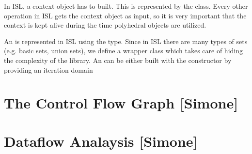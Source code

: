 In ISL, a context object has to built. This is represented by the
 class. Every other operation in ISL gets the context object as
input, so it is very important that the context is kept alive during the time
polyhedral objects are utilized. 

An  is represented in ISL using the  type.
Since in ISL there are many types of sets (e.g. basic sets, union sets), we
define a wrapper class  which takes care of hiding the complexity
of the library. An  can be either built with the constructor by
providing an iteration domain 





\section{The Control Flow Graph [Simone]}
\label{insieme:analysis:cfg}



\section{Dataflow Analaysis [Simone]}
\label{insieme:analysis:dtaflow}
